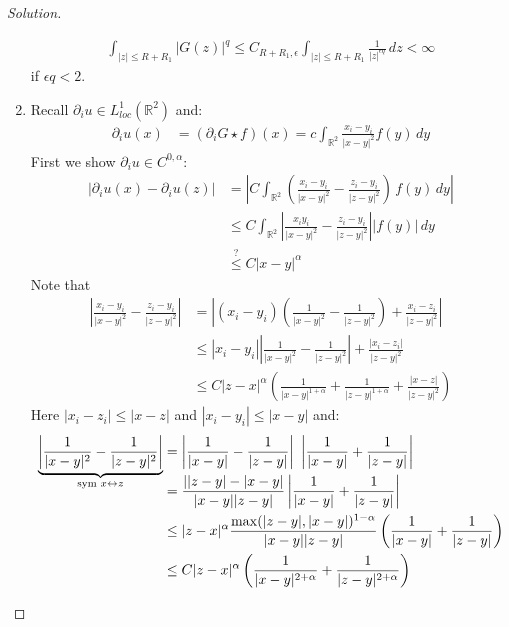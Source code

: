 \documentclass{report}
\theoremstyle{tommy}
\begin{document}
\begin{proof}[Solution]
\begin{enumerate}
      \begin{align*}
        \int_{|z| \le R + R_1} |G(z)|^q \le C_{R + R_1, \epsilon} \int_{|z| \le R + R_1} \frac{1}{|z|^{\epsilon q}} \, dz < \infty
      \end{align*}
      if \(\epsilon q < 2\).
      \item Recall \(\partial_i u \in L_{loc}^1(\mathbb{R}^2)\) and:
      \begin{align*}
        \partial_i u(x) &= (\partial_i G \star f)(x) 
        = c \int_{\mathbb{R}^2} \frac{x_i - y_i}{|x-y|^2} f(y) \, dy
      \end{align*}
      First we show \(\partial_i u \in C^{0, \alpha}\): 
      \begin{align*}
        |\partial_i u(x) - \partial_i u(z)|
        &= \left| C \int_{\mathbb{R}^2} \left(\frac{x_i - y_i}{|x-y|^2} - \frac{z_i - y_i}{|z-y|^2}\right) \, f(y) \, dy \right| \\
        &\le C \int_{\mathbb{R}^2} \left| \frac{x_i y_i}{|x-y|^2} - \frac{z_i - y_i}{|z-y|^2} \right| |f(y)| \, dy \\
        &\overset{?}{\le} C |x-y|^\alpha
      \end{align*}
      Note that 
      \begin{align*}
        \left| \frac{x_i - y_i}{|x-y|^2} - \frac{z_i - y_i}{|z-y|^2} \right| 
        &= \left| (x_i  - y_i) \left(\frac{1}{|x-y|^2} - \frac{1}{|z-y|^2}\right) + \frac{x_i - z_i}{|z-y|^2} \right| \\
        &\le |x_i - y_i| \left| \frac{1}{|x-y|^2} - \frac{1}{|z-y|^2} \right| + \frac{|x_i - z_i|}{|z-y|^2} \\
        &\le C|z-x|^\alpha \left(\frac{1}{|x-y|^{1 + \alpha}} + \frac{1}{|z-y|^{1 + \alpha}} + \frac{|x-z|}{|z-y|^{2}}\right)
      \end{align*}
      Here \(|x_i - z_i| \le |x-z|\) and \(|x_i - y_i| \le |x-y|\) and:
      \begin{align*}
        \smash{\underbrace{\left| \frac{1}{|x-y|^2} - \frac{1}{|z-y|^2} \right|}_{\text{sym } x \leftrightarrow z}}
        &= \left| \frac{1}{|x-y|} - \frac{1}{|z-y|}\right| \left| \frac{1}{|x-y|} + \frac{1}{|z-y|}\right| \\
        &= \frac{||z-y| - |x-y|}{|x-y||z-y|} \left| \frac{1}{|x-y|} + \frac{1}{|z-y|} \right| \\
        &\le |z-x|^\alpha \frac{\max(|z-y|, |x-y|)^{1-\alpha}}{|x-y| |z-y|} \left(\frac{1}{|x-y|} + \frac{1}{|z-y|}\right) \\
        &\le C |z-x|^\alpha \left(\frac{1}{|x-y|^{2 + \alpha}} + \frac{1}{|z-y|^{2 + \alpha}}\right)

\end{align*}
\end{enumerate}
\end{proof}
\end{document}
